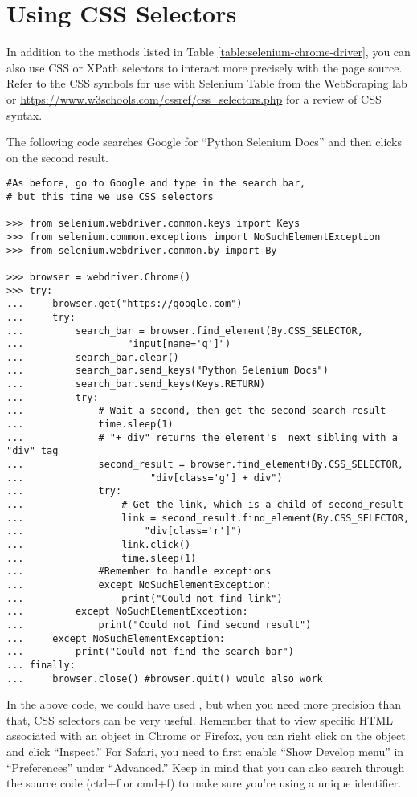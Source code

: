 \section*{Using CSS Selectors}%

In addition to the methods listed in Table \ref{table:selenium-chrome-driver}, you can also use CSS or XPath selectors to interact more precisely with the page source. Refer to the CSS symbols for use with Selenium Table from the WebScraping lab or \url{https://www.w3schools.com/cssref/css_selectors.php} for a review of CSS syntax.

The following code searches Google for ``Python Selenium Docs'' and then clicks on the second result.

\begin{lstlisting}
#As before, go to Google and type in the search bar,
# but this time we use CSS selectors

>>> from selenium.webdriver.common.keys import Keys
>>> from selenium.common.exceptions import NoSuchElementException
>>> from selenium.webdriver.common.by import By

>>> browser = webdriver.Chrome()
>>> try:
...		browser.get("https://google.com")
...		try:
...			search_bar = browser.find_element(By.CSS_SELECTOR,
...					 "input[name='q']")
...			search_bar.clear()
...			search_bar.send_keys("Python Selenium Docs")
...			search_bar.send_keys(Keys.RETURN)
...			try:
...				# Wait a second, then get the second search result
...				time.sleep(1)
...				# "+ div" returns the element's  next sibling with a "div" tag
...				second_result = browser.find_element(By.CSS_SELECTOR,
...						 "div[class='g'] + div")
...				try:
...					# Get the link, which is a child of second_result
...					link = second_result.find_element(By.CSS_SELECTOR,
...						"div[class='r']")
...					link.click()
...					time.sleep(1)
...				#Remember to handle exceptions
...				except NoSuchElementException:
...					print("Could not find link")
...			except NoSuchElementException:
...				print("Could not find second result")
...		except NoSuchElementException:
...			print("Could not find the search bar")
...	finally:
...		browser.close() #browser.quit() would also work

\end{lstlisting}

In the above code, we could have used , but when you need more precision than that, CSS selectors can be very useful.
Remember that to view specific HTML associated with an object in Chrome or Firefox, you can right click on the object and click ``Inspect.''
For Safari, you need to first enable ``Show Develop menu'' in ``Preferences'' under ``Advanced.''
Keep in mind that you can also search through the source code (ctrl+f or cmd+f) to make sure you're using a unique identifier.

